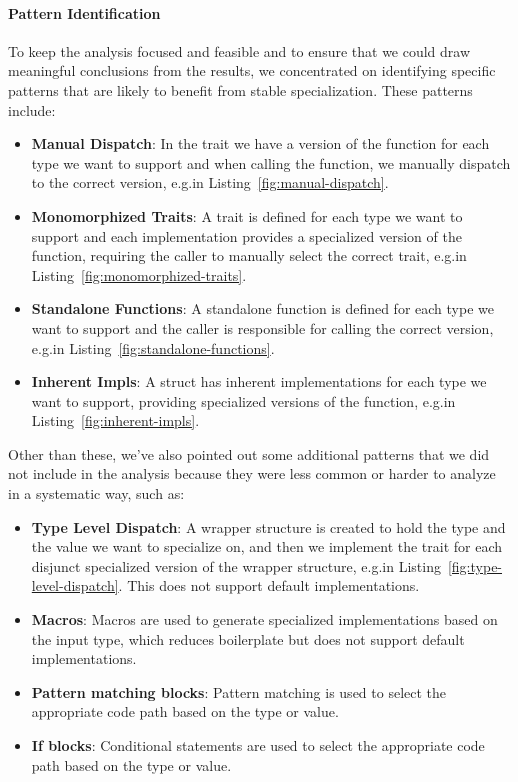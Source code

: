 \paragraph{Pattern Identification}
To keep the analysis focused and feasible and to ensure that we could draw meaningful conclusions from the results, we concentrated on identifying specific patterns that are likely to benefit from stable specialization.
These patterns include:
\begin{itemize}
	\item \textbf{Manual Dispatch}: In the trait we have a version of the function for each type we want to support and when calling the function, we manually dispatch to the correct version, e.g.\@ in Listing~\ref{fig:manual-dispatch}.
	\item \textbf{Monomorphized Traits}: A trait is defined for each type we want to support and each implementation provides a specialized version of the function, requiring the caller to manually select the correct trait, e.g.\@ in Listing~\ref{fig:monomorphized-traits}.
	\item \textbf{Standalone Functions}: A standalone function is defined for each type we want to support and the caller is responsible for calling the correct version, e.g.\@ in Listing~\ref{fig:standalone-functions}.
	\item \textbf{Inherent Impls}: A struct has inherent implementations for each type we want to support, providing specialized versions of the function, e.g.\@ in Listing~\ref{fig:inherent-impls}.
\end{itemize}
Other than these, we've also pointed out some additional patterns that we did not include in the analysis because they were less common or harder to analyze in a systematic way, such as:
\begin{itemize}
	\item \textbf{Type Level Dispatch}: A wrapper structure is created to hold the type and the value we want to specialize on, and then we implement the trait for each disjunct specialized version of the wrapper structure, e.g.\@ in Listing~\ref{fig:type-level-dispatch}. This does not support default implementations.
	\item \textbf{Macros}: Macros are used to generate specialized implementations based on the input type, which reduces boilerplate but does not support default implementations.
	\item \textbf{Pattern matching blocks}: Pattern matching is used to select the appropriate code path based on the type or value.
	\item \textbf{If blocks}: Conditional statements are used to select the appropriate code path based on the type or value.
\end{itemize}
